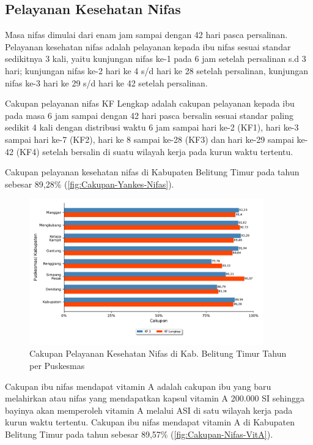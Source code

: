 \subsection{Pelayanan Kesehatan Nifas}
Masa nifas dimulai dari enam jam sampai dengan 42 hari pasca persalinan.
Pelayanan kesehatan nifas adalah pelayanan kepada ibu nifas sesuai standar sedikitnya 3 kali, yaitu kunjungan nifas ke-1 pada 6 jam setelah persalinan s.d 3 hari; kunjungan nifas ke-2 hari ke 4 s/d hari ke 28 setelah persalinan, kunjungan nifas ke-3 hari ke 29 s/d hari ke 42 setelah persalinan.

Cakupan pelayanan nifas KF Lengkap adalah cakupan pelayanan kepada ibu pada masa 6 jam sampai dengan 42 hari pasca bersalin sesuai standar paling sedikit 4 kali dengan distribusi waktu 6 jam sampai hari ke-2 (KF1), hari ke-3 sampai hari ke-7 (KF2), hari ke 8 sampai ke-28 (KF3) dan hari ke-29 sampai ke-42 (KF4) setelah bersalin di suatu wilayah kerja pada kurun waktu tertentu.

Cakupan pelayanan kesehatan nifas di Kabupaten Belitung Timur pada tahun \tP sebesar 89,28\% (\autoref{fig:Cakupan-Yankes-Nifas}).%

\begin{figure}[H]
    \centering{}
    \includegraphics[width=0.9\textwidth]{bab_05/bab_05_05c_layanNifas}
    \caption{Cakupan Pelayanan Kesehatan Nifas di Kab. Belitung Timur Tahun \tP per Puskesmas}
    \label{fig:Cakupan-Yankes-Nifas}
\end{figure}

Cakupan ibu nifas mendapat vitamin A adalah cakupan ibu yang baru melahirkan atau nifas yang mendapatkan kapsul vitamin A 200.000 SI sehingga bayinya akan memperoleh vitamin A melalui ASI di satu wilayah kerja pada kurun waktu tertentu.
Cakupan ibu nifas mendapat vitamin A di Kabupaten Belitung Timur pada tahun \tP sebesar 89,57\% (\autoref{fig:Cakupan-Nifas-VitA}).

